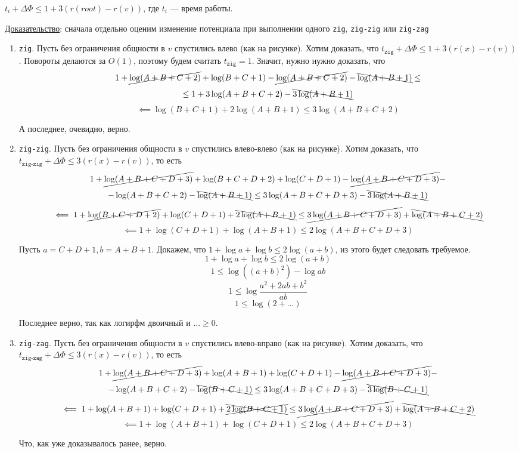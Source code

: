 \begin{statement}
$t_i + \Delta \Phi \leq 1 + 3(r(root) - r(v))$, где $t_i$ --- время работы.
\end{statement}
\underline{Доказательство}: сначала отдельно оценим изменение потенциала при выполнении одного \texttt{zig}, \texttt{zig-zig} или \texttt{zig-zag}
\begin{enumerate}
\item \texttt{zig}. Пусть без ограничения общности в $v$ спустились влево (как на рисунке). Хотим доказать, что $t_\texttt{zig} + \Delta \Phi \leq 1 + 3(r(x) - r(v))$. Повороты делаются за $O(1)$, поэтому будем считать $t_\texttt{zig} = 1$. Значит, нужно нужно доказать, что 
\[ 1 + \cancel{\log(A + B + C + 2)} + \log(B + C + 1) - \cancel{\log(A + B + C + 2)} - \bcancel{\log(A + B + 1)} \leq 
\] \[ \leq 1 + 3 \log(A + B + C + 2) - \bcancel{3\log(A + B + 1)} \]
\[ \impliedby \log(B + C + 1) + 2 \log(A + B + 1) \leq 3 \log(A + B + C + 2) \]


А последнее, очевидно, верно.

\item \texttt{zig-zig}. Пусть без ограничения общности в $v$ спустились влево-влево (как на рисунке). Хотим доказать, что $t_\texttt{zig-zig} + \Delta \Phi \leq 3(r(x) - r(v))$, то есть
\[ 1 + \cancel{\log(A + B + C + D + 3)} + \log(B + C + D + 2) + \log(C + D + 1) - \cancel{\log(A + B + C + D + 3)} - \]
\[ -\log(A + B + C + 2) - \bcancel{\log(A + B + 1)} \leq 3\log(A + B + C + D + 3) - \bcancel{3\log(A + B + 1)} \]
\[ \impliedby 1 + \cancel{\log(B + C + D + 2)} + \log(C + D + 1) + \bcancel{2 \log(A + B + 1)} \leq \cancel{3\log(A + B + C + D + 3)} + \bcancel{\log(A + B + C + 2)}\]
\[ \impliedby 1 + \log(C + D + 1) + \log(A + B + 1) \leq 2\log(A + B + C + D + 3) \]

Пусть $a = C + D + 1, b = A + B + 1$. Докажем, что $1 + \log a + \log b \leq 2\log (a + b)$, из этого будет следовать требуемое. 
\[ 1 + \log a + \log b \leq 2 \log(a + b) \]
\[ 1 \leq \log((a + b)^2) - \log ab \]
\[ 1 \leq \log \frac{a^2 + 2ab + b^2}{ab} \]
\[ 1 \leq \log (2 + ...) \]

Последнее верно, так как логирфм двоичный и $... \geq 0$.

\item \texttt{zig-zag}. Пусть без ограничения общности в $v$ спустились влево-вправо (как на рисунке). Хотим доказать, что $t_\texttt{zig-zag} + \Delta \Phi \leq 3(r(x) - r(v))$, то есть
\[ 1 + \cancel{\log(A + B + C + D + 3)} + \log(A + B + 1) + \log(C + D + 1) - \cancel{\log(A + B + C + D + 3)} - 
\] \[  - \log(A + B + C + 2) - \bcancel{\log(B + C + 1)} \leq 3\log(A + B + C + D + 3) - \bcancel{3\log(B + C + 1)} \]
\[ \impliedby 1 + \log(A + B + 1) + \log(C + D + 1) + \xcancel{2 \log(B + C + 1)} \leq \cancel{3\log(A + B + C + D + 3)} + \bcancel{\log(A + B + C + 2)} \]
\[ \impliedby 1 + \log(A + B + 1) + \log(C + D + 1) \leq 2\log(A + B + C + D + 3) \]

Что, как уже доказывалось ранее, верно.
\end{enumerate}

